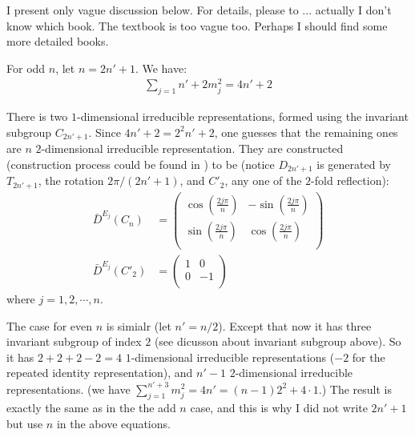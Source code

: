 I present only vague discussion below. For details, please to ...
actually I don't know which book. The textbook \cite{book} is too
vague too. Perhaps I should find some more detailed books.

For odd $n$, let $n=2n'+1$. We have:
\begin{align}
    \sum_{j=1}{n'+2} m_j^2 = 4n'+2
\end{align}

There is two $1$-dimensional irreducible representations, formed using
the invariant subgroup $C_{2n'+1}$. Since $4n'+2 = 2^2 n'+2$, one
guesses that the remaining ones are $n$ $2$-dimensional irreducible
representation. They are constructed (construction process could be
found in \cite{book}) to be (notice $D_{2n'+1}$ is generated by
$T_{2n'+1}$, the rotation $2\pi/(2n'+1)$, and $C'_2$, any one of the
$2$-fold reflection):
\begin{align}
    \bar{D}^{E_j}(C_{n}) &=\left( \begin{array}{cc}
    \cos(\frac{2j\pi}{n}) & -\sin(\frac{2j\pi}{n}) \\
    \sin(\frac{2j\pi}{n}) & \cos(\frac{2j\pi}{n}) \\
        \end{array} \right) \\
    \bar{D}^{E_j}(C'_{2}) &= \left( \begin{array}{cc}
                 1 & 0 \\
                 0 & -1 \\ 
                 \end{array} \right)
\end{align}
where $j=1,2,\cdots,n$.

The case for even $n$ is simialr (let $n'=n/2$). Except that now it
has three invariant subgroup of index $2$ (see dicusson about invariant
subgroup above). So it has $2+2+2-2=4$ $1$-dimensional irreducible
representations ($-2$ for the repeated identity representation), and
$n'-1$ $2$-dimensional irreducible representations.
(we have $\sum_{j=1}^{n'+3}m_j^2 = 4n' = (n-1)2^2 + 4\cdot 1$.)
The result is exactly the same as in the the add $n$ case, and this is
why I did not write $2n'+1$ but use $n$ in the above equations.

